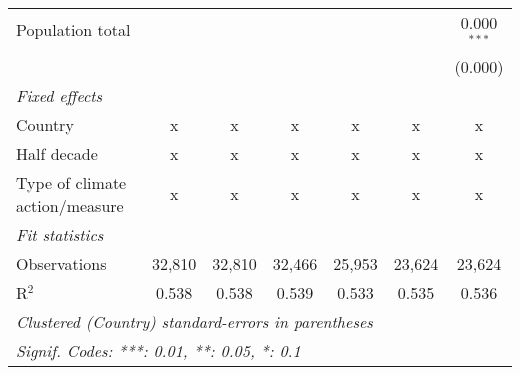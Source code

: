 \begin{tabular}{lcccccc}
   Population total                                            &         &               &               &               &               & 0.000$^{***}$\\   
                                                               &         &               &               &               &               & (0.000)\\   
   \emph{Fixed effects}\\
   Country                                                     & x       & x             & x             & x             & x             & x\\  
   Half decade                                                 & x       & x             & x             & x             & x             & x\\  
   Type of climate action/measure                              & x       & x             & x             & x             & x             & x\\  
   \midrule \emph{Fit statistics}\\
   Observations                                                & 32,810  & 32,810        & 32,466        & 25,953        & 23,624        & 23,624\\  
   R$^2$                                                       & 0.538   & 0.538         & 0.539         & 0.533         & 0.535         & 0.536\\  
   \midrule
   \multicolumn{7}{l}{\emph{Clustered (Country) standard-errors in parentheses}}\\
   \multicolumn{7}{l}{\emph{Signif. Codes: ***: 0.01, **: 0.05, *: 0.1}}\\
\end{tabular}
\par\endgroup


